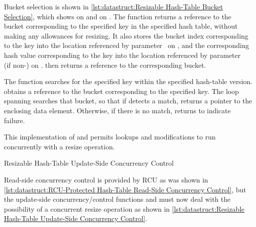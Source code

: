 \begin{fcvref}
Bucket selection is shown in
\cref{lst:datastruct:Resizable Hash-Table Bucket Selection},
which shows  on
 and  on
.
The  function returns a reference to the bucket
corresponding to the specified key in the specified hash table, without
making any allowances for resizing.
It also stores the bucket index corresponding to the key into the location
referenced by parameter~ on
, and the corresponding
hash value corresponding to the key into the location
referenced by parameter~ (if non-) on .
 then returns a reference to the corresponding bucket.

The  function searches for the specified key
within the specified hash-table version.
 obtains a reference to the bucket corresponding
to the specified key.
The loop spanning  searches
that bucket, so that if  detects a match,
 returns a pointer to the enclosing data element.
Otherwise, if there is no match,
 returns  to indicate
failure.
\end{fcvref}

\QuickQuizEnd

This implementation of  and 
permits lookups and modifications to run concurrently with a resize
operation.

\begin{listing}

\caption{Resizable Hash-Table Update-Side Concurrency Control}
\label{lst:datastruct:Resizable Hash-Table Update-Side Concurrency Control}
\end{listing}

Read-side concurrency control is provided by RCU as was shown in
\cref{lst:datastruct:RCU-Protected Hash-Table Read-Side Concurrency Control},
but the update-side concurrency\-/control functions
 and 
must now deal with the possibility of a
concurrent resize operation as shown in
\cref{lst:datastruct:Resizable Hash-Table Update-Side Concurrency Control}.

